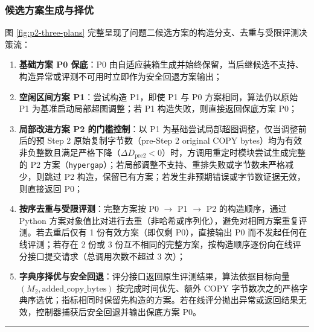 \documentclass[anonymous,withtoc]{gmcm2026}
\providecommand{\tightlist}{\setlength{\itemsep}{0pt}\setlength{\parskip}{0pt}}
\begin{document}
\subsubsection{候选方案生成与择优}

图 \ref{fig:p2-three-plans} 完整呈现了问题二候选方案的构造分支、去重与受限评测决策流：

\begin{enumerate}
\def\labelenumi{\arabic{enumi}.}
\tightlist
\item
  \textbf{基础方案 P0 保底}：P0 由自适应装箱生成并始终保留，当后继候选不支持、构造异常或评测不可用时立即作为安全回退方案输出；
\item
  \textbf{空闲区间方案 P1}：尝试构造 P1，即使 P1 与 P0 方案相同，算法仍以原始 P1 为基准启动局部超图调整；若 P1 构造失败，则直接返回保底方案 P0；
\item
  \textbf{局部改进方案 P2 的门槛控制}：以 P1 为基础尝试局部超图调整，仅当调整前后的预 Step 2 原始复制字节数（pre-Step 2 original COPY bytes）均为有效非负整数且满足严格下降（\(\Delta D_{\mathrm{pre2}} < 0\)）时，方调用重定时模块尝试生成完整的 P2 方案（\texttt{hypergap}）；若局部调整不支持、重排失败或字节数未严格减少，则跳过 P2 构造，保留已有方案；若发生非预期错误或字节数证据无效，则直接返回 P0；
\item
  \textbf{按序去重与受限评测}：完整方案按 P0 \(\to\) P1 \(\to\) P2 的构造顺序，通过 Python 方案对象值比对进行去重（非哈希或序列化），避免对相同方案重复评测。若去重后仅有 1 份有效方案（即仅剩 P0），直接输出 P0 而不发起任何在线评测；若存在 2 份或 3 份互不相同的完整方案，按构造顺序逐份向在线评分接口提交请求（总调用次数不超过 3 次）；
\item
  \textbf{字典序择优与安全回退}：评分接口返回原生评测结果，算法依据目标向量 \((M_2,\allowbreak \text{added\_copy\_bytes})\) 按完成时间优先、额外 COPY 字节数次之的严格字典序选优；指标相同时保留先构造的方案。若在线评分抛出异常或返回结果无效，控制器捕获后安全回退并输出保底方案 P0。
\end{enumerate}

\FloatBarrier
\par{}\begingroup\normalsize
\captionsetup{type=algorithm,position=top,justification=raggedright,singlelinecheck=false,labelfont=bf}
\label{alg:p2-adaptive-hypergap}
\nopagebreak\hrule\nopagebreak
\end{document}
